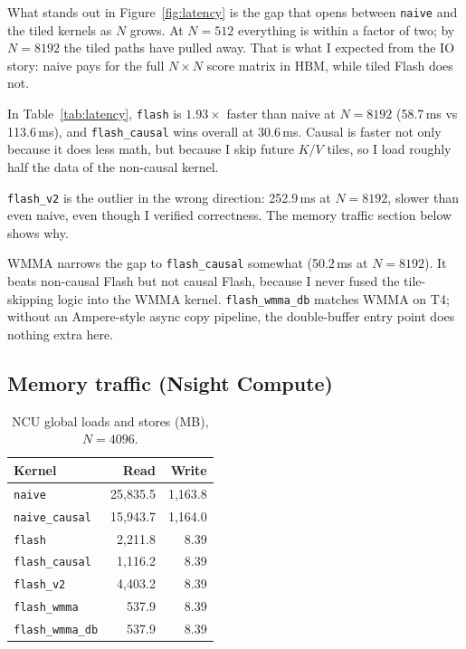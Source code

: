 \documentclass[12pt]{article}
\begin{document}
What stands out in Figure~\ref{fig:latency} is the gap that opens between \texttt{naive} and the tiled kernels as $N$ grows. At $N = 512$ everything is within a factor of two; by $N = 8192$ the tiled paths have pulled away. That is what I expected from the IO story: naive pays for the full $N{\times}N$ score matrix in HBM, while tiled Flash does not.

In Table~\ref{tab:latency}, \texttt{flash} is $1.93\times$ faster than naive at $N = 8192$ (58.7\,ms vs 113.6\,ms), and \texttt{flash\_causal} wins overall at 30.6\,ms. Causal is faster not only because it does less math, but because I skip future $K/V$ tiles, so I load roughly half the data of the non-causal kernel.

\texttt{flash\_v2} is the outlier in the wrong direction: 252.9\,ms at $N = 8192$, slower than even naive, even though I verified correctness. The memory traffic section below shows why.

WMMA narrows the gap to \texttt{flash\_causal} somewhat (50.2\,ms at $N = 8192$). It beats non-causal Flash but not causal Flash, because I never fused the tile-skipping logic into the WMMA kernel. \texttt{flash\_wmma\_db} matches WMMA on T4; without an Ampere-style async copy pipeline, the double-buffer entry point does nothing extra here.

\subsection{Memory traffic (Nsight Compute)}

\begin{table}[H]
    \centering
    \caption{NCU global loads and stores (MB), $N{=}4096$.}
    \label{tab:hbm4096}
    \begin{tabular}{lrr}
        \toprule
        Kernel & Read & Write \\
        \midrule
        \texttt{naive} & 25{,}835.5 & 1{,}163.8 \\
        \texttt{naive\_causal} & 15{,}943.7 & 1{,}164.0 \\
        \texttt{flash} & 2{,}211.8 & 8.39 \\
        \texttt{flash\_causal} & 1{,}116.2 & 8.39 \\
        \texttt{flash\_v2} & 4{,}403.2 & 8.39 \\
        \texttt{flash\_wmma} & 537.9 & 8.39 \\
        \texttt{flash\_wmma\_db} & 537.9 & 8.39 \\
        \bottomrule
    \end{tabular}
\end{table}
\end{document}
